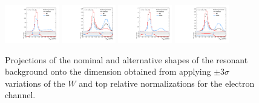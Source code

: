 \begin{figure}[htbp]
  \centering
  \includegraphics[width=0.21\textwidth]{fig/analysisAppendix/systs_res_e_HP_nobb_LDy_fractionY_ProjY.pdf}
  \includegraphics[width=0.21\textwidth]{fig/analysisAppendix/systs_res_e_LP_nobb_LDy_fractionY_ProjY.pdf}
  \includegraphics[width=0.21\textwidth]{fig/analysisAppendix/systs_res_e_HP_nobb_HDy_fractionY_ProjY.pdf}
  \includegraphics[width=0.21\textwidth]{fig/analysisAppendix/systs_res_e_LP_nobb_HDy_fractionY_ProjY.pdf}\\
  \caption{
    Projections of the nominal and alternative shapes of the resonant background onto the \MJ dimension obtained from applying $\pm3\sigma$ variations of the $W$ and top relative normalizations for the electron channel.
  }
  \label{fig:systResMJ_fractionY}
\end{figure}


